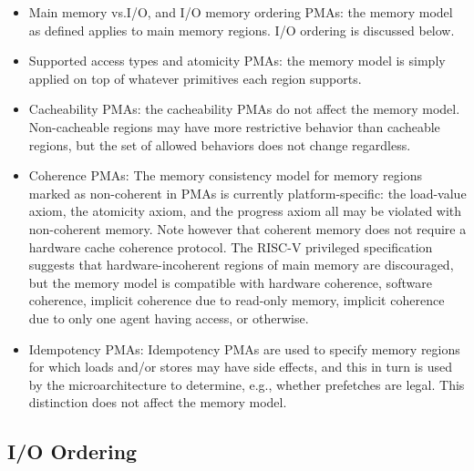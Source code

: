 \begin{itemize}
  \item Main memory vs.\@ I/O, and I/O memory ordering PMAs: the memory model as defined applies to main memory regions.  I/O ordering is discussed below.
  \item Supported access types and atomicity PMAs: the memory model is simply applied on top of whatever primitives each region supports.
  \item Cacheability PMAs: the cacheability PMAs do not affect the memory model.  Non-cacheable regions may have more restrictive behavior than cacheable regions, but the set of allowed behaviors does not change regardless.
  \item Coherence PMAs: The memory consistency model for memory regions marked as non-coherent in PMAs is currently platform-specific: the load-value axiom, the atomicity axiom, and the progress axiom all may be violated with non-coherent memory.  Note however that coherent memory does not require a hardware cache coherence protocol.  The RISC-V privileged specification suggests that hardware-incoherent regions of main memory are discouraged, but the memory model is compatible with hardware coherence, software coherence, implicit coherence due to read-only memory, implicit coherence due to only one agent having access, or otherwise.
  \item Idempotency PMAs: Idempotency PMAs are used to specify memory regions for which loads and/or stores may have side effects, and this in turn is used by the microarchitecture to determine, e.g., whether prefetches are legal.  This distinction does not affect the memory model.
\end{itemize}


\subsection{I/O Ordering}


